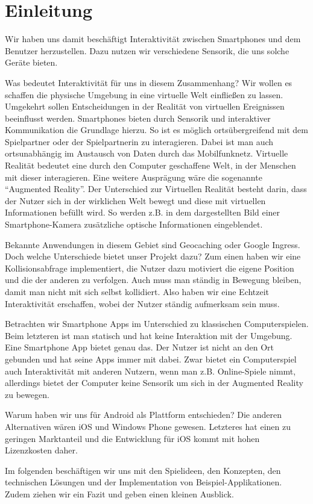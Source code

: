\chapter{Einleitung}
Wir haben uns damit beschäftigt Interaktivität zwischen Smartphones und dem Benutzer herzustellen. Dazu nutzen wir verschiedene Sensorik, die uns solche Geräte bieten.

Was bedeutet Interaktivität für uns in diesem Zusammenhang? Wir wollen es schaffen die physische Umgebung in eine virtuelle Welt einfließen zu lassen. Umgekehrt sollen Entscheidungen in der Realität von virtuellen Ereignissen beeinflusst werden.
Smartphones bieten durch Sensorik und interaktiver Kommunikation die Grundlage hierzu. So ist es möglich ortsübergreifend mit dem Spielpartner oder der Spielpartnerin zu interagieren. Dabei ist man auch ortsunabhängig im Austausch von Daten durch das Mobilfunknetz. 
Virtuelle Realität bedeutet eine durch den Computer geschaffene Welt, in der Menschen mit dieser interagieren.
Eine weitere Ausprägung wäre die sogenannte “Augmented Reality”. Der Unterschied zur Virtuellen Realität besteht darin, dass der Nutzer sich in der wirklichen Welt bewegt und diese mit virtuellen Informationen befüllt wird. So werden z.B. in dem dargestellten Bild einer Smartphone-Kamera zusätzliche optische Informationen eingeblendet.

Bekannte Anwendungen in diesem Gebiet sind Geocaching oder Google Ingress. Doch welche Unterschiede bietet unser Projekt dazu?
Zum einen haben wir eine Kollisionsabfrage implementiert, die Nutzer dazu motiviert die eigene Position und die der anderen zu verfolgen. Auch muss man ständig in Bewegung bleiben, damit man nicht mit sich selbst kollidiert. Also haben wir eine Echtzeit Interaktivität erschaffen, wobei der Nutzer ständig aufmerksam sein muss. 

Betrachten wir Smartphone Apps im Unterschied zu klassischen Computerspielen. Beim letzteren ist man statisch und hat keine Interaktion mit der Umgebung. Eine Smartphone App bietet genau das. Der Nutzer ist nicht an den Ort gebunden und hat seine Apps immer mit dabei. 
Zwar bietet ein Computerspiel auch Interaktivität mit anderen Nutzern, wenn man z.B. Online-Spiele nimmt, allerdings bietet der Computer keine Sensorik um sich in der Augmented Reality zu bewegen.

Warum haben wir uns für Android als Plattform entschieden? Die anderen Alternativen wären iOS und Windows Phone gewesen. Letzteres hat einen zu geringen Marktanteil \cite{android} und die Entwicklung für iOS kommt mit hohen Lizenzkosten daher.  

Im folgenden beschäftigen wir uns mit den Spielideen, den Konzepten, den technischen Lösungen und der Implementation von Beispiel-Applikationen. Zudem ziehen wir ein Fazit und geben einen kleinen Ausblick.

\newpage

